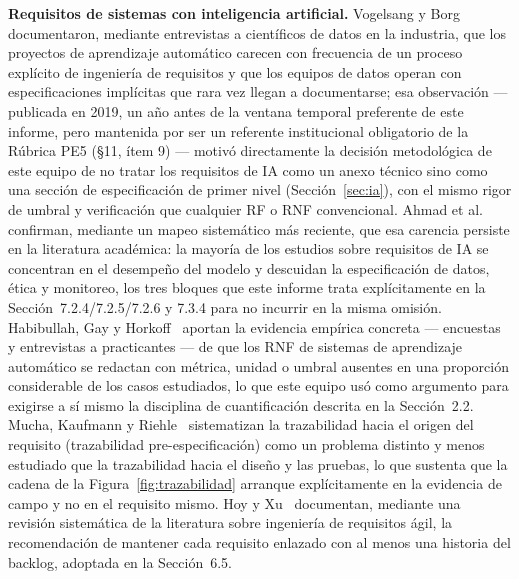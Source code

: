 \documentclass[11pt,a4paper]{article}
\begin{document}
\textbf{Requisitos de sistemas con inteligencia artificial.} Vogelsang y
Borg~\cite{vogelsangborg2019} documentaron, mediante entrevistas a científicos de datos en la
industria, que los proyectos de aprendizaje automático carecen con frecuencia de un proceso
explícito de ingeniería de requisitos y que los equipos de datos operan con especificaciones
implícitas que rara vez llegan a documentarse; esa observación --- publicada en 2019, un año antes
de la ventana temporal preferente de este informe, pero mantenida por ser un referente institucional
obligatorio de la Rúbrica PE5 (\S 11, ítem 9) --- motivó directamente la decisión metodológica de
este equipo de no tratar los requisitos de IA como un anexo técnico sino como una sección de
especificación de primer nivel (Sección~\ref{sec:ia}), con el mismo rigor de umbral y verificación
que cualquier RF o RNF convencional. Ahmad et al.~\cite{ahmad2023} confirman, mediante un mapeo
sistemático más reciente, que esa carencia persiste en la literatura académica: la mayoría de los
estudios sobre requisitos de IA se concentran en el desempeño del modelo y descuidan la
especificación de datos, ética y monitoreo, los tres bloques que este informe trata explícitamente
en la Sección~7.2.4/7.2.5/7.2.6 y 7.3.4 para no incurrir en la misma omisión. Habibullah, Gay y
Horkoff~\cite{habibullah2023} aportan la evidencia empírica concreta --- encuestas y entrevistas a
practicantes --- de que los RNF de sistemas de aprendizaje automático se redactan con métrica,
unidad o umbral ausentes en una proporción considerable de los casos estudiados, lo que este equipo
usó como argumento para exigirse a sí mismo la disciplina de cuantificación descrita en la
Sección~2.2. Mucha, Kaufmann y Riehle~\cite{mucha2024} sistematizan la trazabilidad hacia el origen
del requisito (trazabilidad pre-especificación) como un problema distinto y menos estudiado que la
trazabilidad hacia el diseño y las pruebas, lo que sustenta que la cadena de la
Figura~\ref{fig:trazabilidad} arranque explícitamente en la evidencia de campo y no en el requisito
mismo. Hoy y Xu~\cite{hoyxu2023} documentan, mediante una revisión sistemática de la literatura
sobre ingeniería de requisitos ágil, la recomendación de mantener cada requisito enlazado con al
menos una historia del backlog, adoptada en la Sección~6.5.
\end{document}
